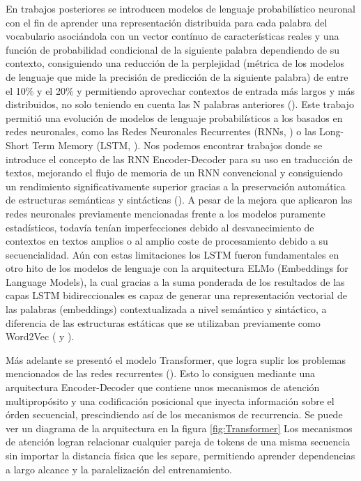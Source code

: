 En trabajos posteriores se introducen modelos de lenguaje probabilístico neuronal con el fin de aprender una representación distribuida para cada palabra del vocabulario asociándola con un vector contínuo de características reales y una función de probabilidad condicional de la siguiente palabra dependiendo de su contexto, consiguiendo una reducción de la perplejidad (métrica de los modelos de lenguaje que mide la precisión de predicción de la siguiente palabra) de entre el 10\% y el 20\% y permitiendo aprovechar contextos de entrada más largos y más distribuidos, no solo teniendo en cuenta las N palabras anteriores (\cite{PmodelML}).
Este trabajo permitió una evolución de modelos de lenguaje probabilísticos a los basados en redes neuronales, como las Redes Neuronales Recurrentes (RNNs, \cite{RNNDef}) o las Long-Short Term Memory (LSTM, \cite{LSTM}).
Nos podemos encontrar trabajos donde se introduce el concepto de las RNN Encoder-Decoder para su uso en traducción de textos, mejorando el flujo de memoria de un RNN convencional y consiguiendo un rendimiento significativamente superior gracias a la preservación automática de estructuras semánticas y sintácticas (\cite{RNN}).
A pesar de la mejora que aplicaron las redes neuronales previamente mencionadas frente a los modelos puramente estadísticos, todavía tenían imperfecciones debido al desvanecimiento de contextos en textos amplios o al amplio coste de procesamiento debido a su secuencialidad.
Aún con estas limitaciones los LSTM fueron fundamentales en otro hito de los modelos de lenguaje con la arquitectura ELMo (Embeddings for Language Models), la cual gracias a la suma ponderada de los resultados de las capas LSTM bidireccionales es capaz de generar una representación vectorial de las palabras (embeddings) contextualizada a nivel semántico y sintáctico, a diferencia de las estructuras estáticas que se utilizaban previamente como Word2Vec (\cite{ELMo} y \cite{Word2Vec}).

Más adelante se presentó el modelo Transformer, que logra suplir los problemas mencionados de las redes recurrentes (\cite{Atencion}).
Esto lo consiguen mediante una arquitectura Encoder-Decoder que contiene unos mecanismos de atención multipropósito y una codificación posicional que inyecta información sobre el órden secuencial, prescindiendo así de los mecanismos de recurrencia.
Se puede ver un diagrama de la arquitectura en la figura \ref{fig:Transformer}
Los mecanismos de atención logran relacionar cualquier pareja de tokens de una misma secuencia sin importar la distancia física que les separe, permitiendo aprender dependencias a largo alcance y la paralelización del entrenamiento.

